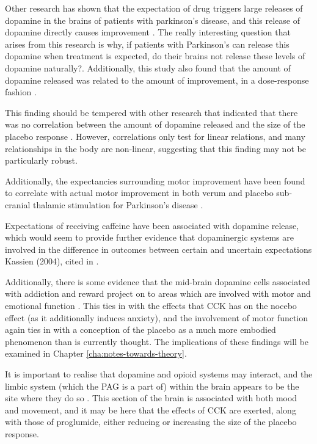 Other research has shown that the expectation of drug triggers large releases of dopamine in the brains of patients with parkinson's disease, and this release of dopamine directly causes improvement \cite{Pollo2002}. The really interesting question that arises from this research is why, if patients with Parkinson's can release this dopamine when treatment is expected, do their brains not release these levels of dopamine naturally?. Additionally, this study also found that the amount of dopamine released was related to the amount of improvement, in a dose-response fashion \cite{Fuente-Fernandez2002}. 

This finding should be tempered with other research that indicated that there was no correlation between the amount of dopamine released and the size of the placebo response \cite{Scott2007a}. However, correlations only test for linear relations, and many relationships in the body are non-linear, suggesting that this finding may not be particularly robust. 

Additionally, the expectancies surrounding motor improvement have been found to correlate with actual motor improvement in both verum and placebo sub-cranial thalamic stimulation for Parkinson's disease \cite{Benedetti2004a}. 

Expectations of receiving caffeine have been associated with dopamine release, which would seem to provide further evidence that dopaminergic systems are involved in the difference in outcomes between certain and uncertain expectations Kassien (2004), cited in \cite{Beauregard2007a}. 

Additionally, there is some evidence that the mid-brain dopamine cells associated with addiction and reward project on to areas which are involved with motor and emotional function \cite{DeLaFuente-Fernandez2002}.  This ties in with the effects that CCK has on the nocebo effect (as it additionally induces anxiety), and the involvement of motor function again ties in with a conception of the placebo as a much more embodied phenomenon than is currently thought. The implications of these findings will be examined in Chapter \ref{cha:notes-towards-theory}. 

It is important to realise that dopamine and opioid systems may interact, and the limbic system (which the PAG is a part of) within the brain appears to be the site where they do so \cite{Fuente-FernAndez2002}. This section of the brain is associated with both mood and movement, and it may be here that the effects of CCK are exerted, along with those of proglumide, either reducing or increasing the size of the placebo response. 

